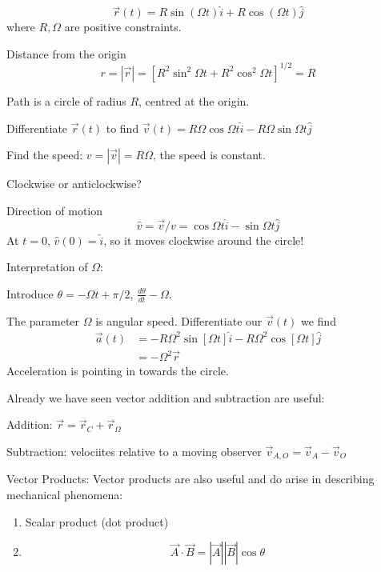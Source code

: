 \begin{example}
\[\vec{r}(t) = R\sin(\Omega t)\hat{i} + R\cos(\Omega t)\hat{j}\]
where $R, \Omega$ are positive constraints. 

Distance from the origin 
\[r = |\vec{r}| = [R^2\sin^2\Omega t + R^2\cos^2\Omega t]^{1/2} = R\]

Path is a circle of radius $R$, centred at the origin. 


Differentiate $\vec{r}(t)$ to find $\vec{v}(t) = R\Omega \cos \Omega t\hat{i} - R\Omega \sin \Omega t \hat{j}$

Find the speed: $v = |\vec{v}| = R\Omega$, the speed is constant. 

Clockwise or anticlockwise? 

Direction of motion
\[\hat{v}= \vec{v}/v = \cos \Omega t\hat{i} - \sin\Omega t \hat{j}\]
At $t = 0$, $\hat{v}(0) = \hat{i}$, so it moves clockwise around the circle!

Interpretation of $\Omega$:

Introduce $\theta = -\Omega t + \pi/2$, $\frac{d\theta}{dt} - \Omega$. 

The parameter $\Omega$ is angular speed. Differentiate our $\vec{v}(t)$ we find
\[\begin{aligned}
\vec{a}(t) &= -R\Omega^2 \sin[\Omega t]\hat{i} - R\Omega^2\cos[\Omega t]\hat{j}\\
&= -\Omega^2 \vec{r}	
\end{aligned}
\]
Acceleration is pointing in towards the circle. 
\end{example}




  

Already we have seen vector addition and subtraction are useful:

Addition: $\vec{r} = \vec{r}_C + \vec{r}_\Omega$

Subtraction: velociites relative to a moving observer $\vec{v}_{A,O} = \vec{v}_A - \vec{v}_O$


Vector Products: Vector products are also useful and do arise in describing mechanical phenomena: 

\begin{enumerate}
\item Scalar product (dot product)
\item 
\[\vec{A} \cdot \vec{B} = |\vec{A}||\vec{B}|\cos \theta\]

	
\end{enumerate}




